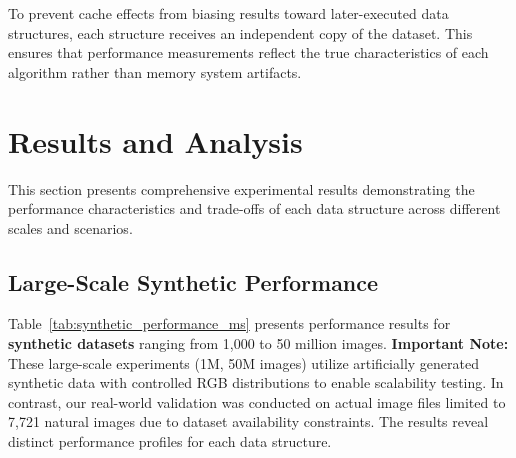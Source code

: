 \documentclass{sbc2023}
\begin{document}
To prevent cache effects from biasing results toward later-executed data structures, each structure receives an independent copy of the dataset. This ensures that performance measurements reflect the true characteristics of each algorithm rather than memory system artifacts.

\section{Results and Analysis}
\label{sec:results}

This section presents comprehensive experimental results demonstrating the performance characteristics and trade-offs of each data structure across different scales and scenarios.

\subsection{Large-Scale Synthetic Performance}

Table~\ref{tab:synthetic_performance_ms} presents performance results for \textbf{synthetic datasets} ranging from 1,000 to 50 million images. \textbf{Important Note:} These large-scale experiments (1M, 50M images) utilize artificially generated synthetic data with controlled RGB distributions to enable scalability testing. In contrast, our real-world validation was conducted on actual image files limited to 7,721 natural images due to dataset availability constraints. The results reveal distinct performance profiles for each data structure.
\end{document}
